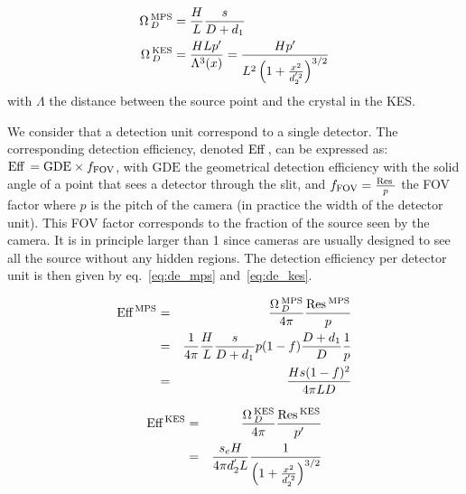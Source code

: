 \documentclass[a4paper,english]{article}
\begin{document}
\begin{align}  
  \Omega\,_D^{\textrm{MPS}} & = \frac{H}{L} \frac{s}{D+d_1} \label{eq:solid_angle_mps} \\
	\Omega\,_D^{\textrm{KES}} & = \frac{H L p'}{\Lambda^3(x)} =  \frac{H p'}{L^2 \left( 1+\frac{x^2}{d_2^{'2}} \right)^{3/2}} \label{eq:solid_angle_kes} 
\end{align}
with $\Lambda$ the distance between the source point and the crystal in the KES.

We consider that a detection unit correspond to a single detector. The
corresponding detection efficiency, denoted $\textrm{Eff}\,_{}$, can be expressed as:
$\textrm{Eff}\,_{} = \textrm{GDE} \times f_{\textrm{FOV}}$, with $\textrm{GDE}$ the geometrical
detection efficiency with the solid angle of a point that sees a detector
through the slit, and $f_{\textrm{FOV}} = \frac{\textrm{Res}\,_{}}{p}$ the FOV factor
where $p$ is the pitch of the camera (in practice the width of the detector
unit). This FOV factor corresponds to the fraction of the source seen by the
camera. It is in principle larger than 1 since cameras are usually designed to
see all the source without any hidden regions. The detection efficiency per
detector unit is then given by eq.~\ref{eq:de_mps} and~\ref{eq:de_kes}.

\begin{eqnarray}
  \label{eq:de_mps}
  \textrm{Eff}\,_{}^{\textrm{MPS}} & = & \frac{\Omega\,_D^{\textrm{MPS}}}{4\pi} \frac{\textrm{Res}\,_{}^{\textrm{MPS}}}{p} \nonumber\\
                & = & \frac{1}{4\pi} \frac{H}{L} \frac{s}{D+d_1} p(1-f)
                      \frac{D+d_1}{D} \frac{1}{p} \nonumber\\
                & = & \frac{Hs(1-f)^2}{4 \pi L D}
\end{eqnarray}

\begin{eqnarray}
  \label{eq:de_kes}
	\textrm{Eff}\,_{}^{\textrm{KES}} & = & \frac{\Omega\,_D^{\textrm{KES}}}{4\pi} \frac{\textrm{Res}\,_{}^{\textrm{KES}}}{p'} \nonumber\\
	& = & \frac{s_e H}{4\pi d_2^{'} L} \frac{1}{\left( 1+\frac{x^2}{d_2^{'2}}\right)^{3/2}}
\end{eqnarray}


\end{document}
